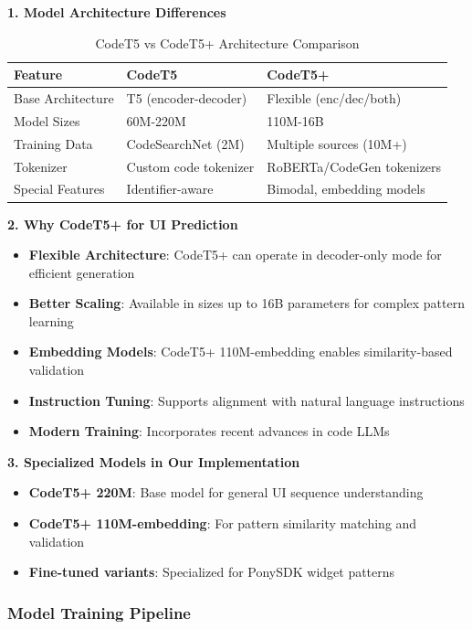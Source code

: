 \documentclass[12pt,a4paper]{article}
\begin{document}
\textbf{1. Model Architecture Differences}

\begin{table}[H]
\centering
\begin{tabular}{|l|l|l|}
\hline
\textbf{Feature} & \textbf{CodeT5} & \textbf{CodeT5+} \\
\hline
Base Architecture & T5 (encoder-decoder) & Flexible (enc/dec/both) \\
Model Sizes & 60M-220M & 110M-16B \\
Training Data & CodeSearchNet (2M) & Multiple sources (10M+) \\
Tokenizer & Custom code tokenizer & RoBERTa/CodeGen tokenizers \\
Special Features & Identifier-aware & Bimodal, embedding models \\
\hline
\end{tabular}
\caption{CodeT5 vs CodeT5+ Architecture Comparison}
\label{tab:codet5-comparison}
\end{table}

\textbf{2. Why CodeT5+ for UI Prediction}

\begin{itemize}
\item \textbf{Flexible Architecture}: CodeT5+ can operate in decoder-only mode for efficient generation
\item \textbf{Better Scaling}: Available in sizes up to 16B parameters for complex pattern learning
\item \textbf{Embedding Models}: CodeT5+ 110M-embedding enables similarity-based validation
\item \textbf{Instruction Tuning}: Supports alignment with natural language instructions
\item \textbf{Modern Training}: Incorporates recent advances in code LLMs
\end{itemize}

\textbf{3. Specialized Models in Our Implementation}

\begin{itemize}
\item \textbf{CodeT5+ 220M}: Base model for general UI sequence understanding
\item \textbf{CodeT5+ 110M-embedding}: For pattern similarity matching and validation
\item \textbf{Fine-tuned variants}: Specialized for PonySDK widget patterns
\end{itemize}

\subsubsection{Model Training Pipeline}
\end{document}
